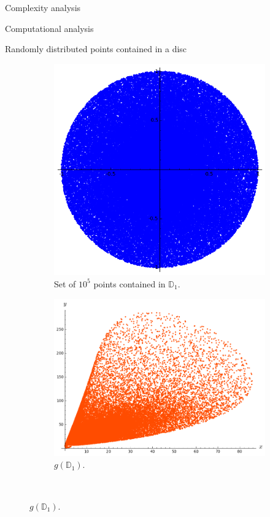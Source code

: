 \documentclass[11pt, a4paper, english, twoside, notitlepage, openright]{report}
\begin{document}
\begin{chapter}{Complexity analysis}
\begin{section}{Computational analysis}
\begin{subsection}{Randomly distributed points contained in a disc}
\begin{figure}[ht!]
\vspace{-0.6cm}
\hspace{0.1cm}
\begin{subfigure}{.45\linewidth}\centering
\includegraphics[width=1\textwidth]{plots/ch5_34_disc.png}
\vspace{-0.4cm}\caption{Set of $10^5$ points contained in ${\mathbb D}_1$.\label{fig:disc}}
\end{subfigure}
\begin{subfigure}{.49\linewidth}\centering
\includegraphics[width=1\textwidth]{plots/ch5_35_disc1.png}
\vspace{-0.4cm}\caption{$g({\mathbb D}_1)$.\label{fig:disc1}}
\end{subfigure}\\[1ex]
\vspace{-0.2cm}


\end{figure}
\end{subsection}
\end{section}
\end{chapter}
\end{document}
